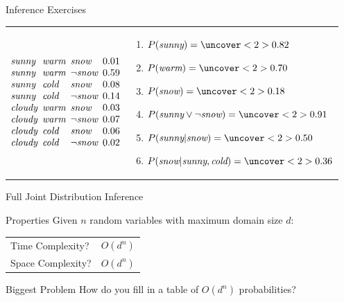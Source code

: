 \documentclass[12pt]{beamer}
\newcommand{\key}[1]{{\color{blue}#1}}
\newcommand{\EM}[1]{\mbox{\em#1}}
\begin{document}
\begin{frame}{Inference Exercises}
	\begin{tabular}{@{}lm{2.2in}@{}}
		\small
		$
		\begin{array}{@{}l@{\hspace{.5em}}l@{\hspace{.5em}}l@{\hspace{.5em}}l@{}}
			\EM{sunny}  & \EM{warm} & \EM{snow}      & 0.01 \\
			\EM{sunny}  & \EM{warm} & \lnot\EM{snow} & 0.59 \\
			\EM{sunny}  & \EM{cold} & \EM{snow}      & 0.08 \\
			\EM{sunny}  & \EM{cold} & \lnot\EM{snow} & 0.14 \\
			\EM{cloudy} & \EM{warm} & \EM{snow}      & 0.03 \\
			\EM{cloudy} & \EM{warm} & \lnot\EM{snow} & 0.07 \\
			\EM{cloudy} & \EM{cold} & \EM{snow}      & 0.06 \\
			\EM{cloudy} & \EM{cold} & \lnot\EM{snow} & 0.02
		\end{array}
		$
		&
		\begin{enumerate}
			\item\small $P(\EM{sunny}) = \uncover<2>{0.82}$
			\item\small $P(\EM{warm}) = \uncover<2>{0.70}$
			\item\small $P(\EM{snow}) = \uncover<2>{0.18}$
			\item\small $P(\EM{sunny} \lor \lnot\EM{snow}) = \uncover<2>{0.91}$
			\item\small $P(\EM{sunny}|\EM{snow}) = \uncover<2>{0.50}$
			\item\small $P(\EM{snow}|\EM{sunny},\EM{cold}) = \uncover<2>{0.36}$
		\end{enumerate}
	\end{tabular}
\end{frame}
\begin{frame}{Full Joint Distribution Inference}
	\begin{block}{Properties}
		Given $n$ random variables with maximum domain size $d$: \\[1em]
		\begin{tabular}{ll}
			\key{Time Complexity?}  & \pause $O(d^{n})$ \\
			\pause
			\key{Space Complexity?} & \pause $O(d^{n})$
		\end{tabular}
	\end{block}
	\pause
	\begin{block}{Biggest Problem}
		How do you fill in a table of $O(d^{n})$ probabilities?
	\end{block}
\end{frame}
\end{document}
